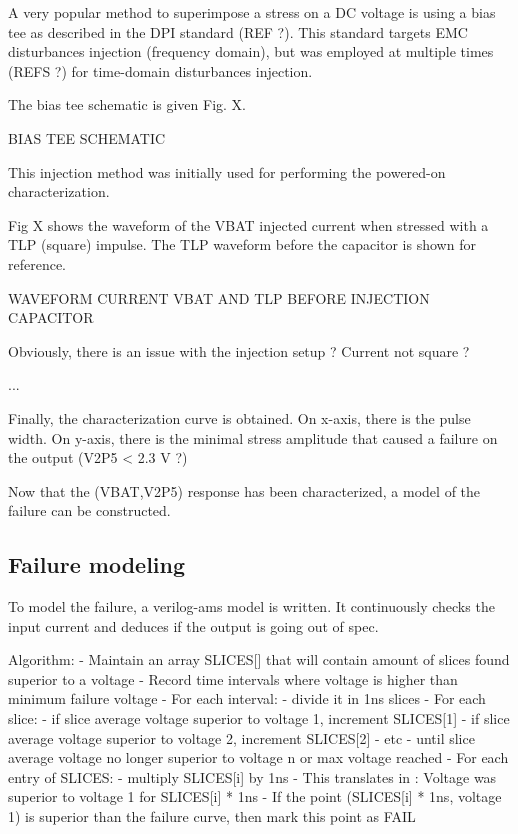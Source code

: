 A very popular method to superimpose a stress on a DC voltage is using a bias tee as described in the DPI standard (REF ?).
This standard targets EMC disturbances injection (frequency domain),
but was employed at multiple times (REFS ?) for time-domain disturbances injection.

The bias tee schematic is given Fig. X.

BIAS TEE SCHEMATIC

This injection method was initially used for performing the powered-on characterization.

Fig X shows the waveform of the VBAT injected current when stressed with a TLP (square) impulse.
The TLP waveform before the capacitor is shown for reference.

WAVEFORM CURRENT VBAT AND TLP BEFORE INJECTION CAPACITOR

Obviously, there is an issue with the injection setup ? Current not square ?

...

Finally, the characterization curve is obtained.
On x-axis, there is the pulse width.
On y-axis, there is the minimal stress amplitude that caused a failure on the output (V2P5 < 2.3 V ?)

Now that the (VBAT,V2P5) response has been characterized, a model of the failure can be constructed.

\subsection{Failure modeling}

To model the failure, a verilog-ams model is written.
It continuously checks the input current and deduces if the output is going out of spec.

Algorithm:
- Maintain an array SLICES[] that will contain amount of slices found superior to a voltage
- Record time intervals where voltage is higher than minimum failure voltage
- For each interval:
  - divide it in 1ns slices
  - For each slice:
      - if slice average voltage superior to voltage 1, increment SLICES[1]
      - if slice average voltage superior to voltage 2, increment SLICES[2]
      - etc
      - until slice average voltage no longer superior to voltage n or max voltage reached
- For each entry of SLICES:
  - multiply SLICES[i] by 1ns
  - This translates in : Voltage was superior to voltage 1 for SLICES[i] * 1ns
  - If the point (SLICES[i] * 1ns, voltage 1) is superior than the failure curve, then mark this point as FAIL

